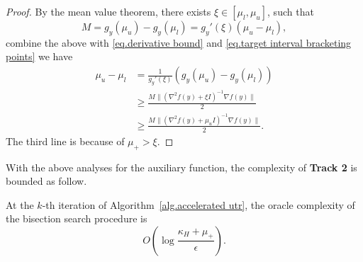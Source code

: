 \documentclass{mcom-l}
\numberwithin{equation}{section}
\begin{document}
\begin{proof}
    By the mean value theorem, there exists $\xi\in \left [\mu_l,\mu_u\right]$, such that
    \begin{equation*}
        M=g_y(\mu_u)-g_y(\mu_l) = g_y'(\xi)(\mu_u-\mu_l),
    \end{equation*}
    combine the above with \eqref{eq.derivative bound} and \eqref{eq.target interval bracketing points} we have
    \begin{equation*}
        \begin{aligned}
            \mu_u-\mu_l & =  \frac{1}{g_y'(\xi)}\left(g_y(\mu_u)-g_y(\mu_l)\right)                    \\
                        & \geq \frac{M\|\left (\nabla ^2 f(y)+\xi I \right )^{-1}\nabla f(y)\|}{2}    \\
                        & \geq \frac{M\|\left (\nabla ^2 f(y)+\mu_u I \right )^{-1}\nabla f(y)\|}{2}.
        \end{aligned}
    \end{equation*}
    The third line is because of $\mu_+ >\xi$.
\end{proof}
With the above analyses for the auxiliary function, the complexity of \textbf{Track 2} is bounded as follow.
\begin{lemma}
    \label{lem.bound initial interval}
    At the $k$-th iteration of Algorithm~\ref{alg.accelerated utr}, the oracle complexity of the bisection search procedure is
    \begin{equation}
        \label{eq.complexity bisection}
        O\left(\log\frac{\kappa_H+\mu_+}{\epsilon}\right).
    \end{equation}
\end{lemma}
\end{document}
